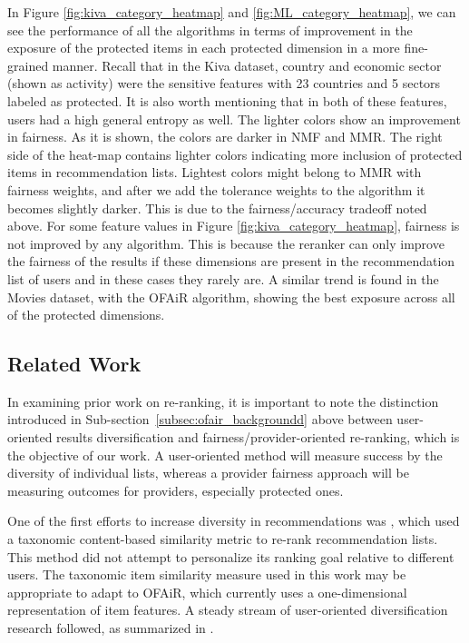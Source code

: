 In Figure \ref{fig:kiva_category_heatmap} and \ref{fig:ML_category_heatmap}, we can see the performance of all the algorithms in terms of improvement in the exposure of the protected items in each protected dimension in a more fine-grained manner. Recall that in the Kiva dataset, country and economic sector (shown as activity) were the sensitive features with 23 countries and 5 sectors labeled as protected. It is also worth mentioning that in both of these features, users had a high general entropy as well. The lighter colors show an improvement in fairness. As it is shown, the colors are darker in NMF and MMR. The right side of the heat-map contains lighter colors indicating more inclusion of protected items in recommendation lists. Lightest colors might belong to MMR with fairness weights, and after we add the tolerance weights to the algorithm it becomes slightly darker. This is due to the fairness/accuracy tradeoff noted above. For some feature values in Figure \ref{fig:kiva_category_heatmap}, fairness is not improved by any algorithm. This is because the reranker can only improve the fairness of the results if these dimensions are present in the recommendation list of users and in these cases they rarely are. A similar trend is found in the Movies dataset, with the OFAiR algorithm, showing the best exposure across all of the protected dimensions. 


\subsection{Related Work}
\label{subsec:ofair_related_work}

In examining prior work on re-ranking, it is important to note the distinction introduced in Sub-section~\ref{subsec:ofair_backgroundd} above between user-oriented results diversification and fairness/provider-oriented re-ranking, which is the objective of our work. A user-oriented method will measure success by the diversity of individual lists, whereas a provider fairness approach will be measuring outcomes for providers, especially protected ones.

One of the first efforts to increase diversity in recommendations was \cite{Ziegler:2005:IRL:1060745.1060754}, which used a taxonomic content-based similarity metric to re-rank recommendation lists. This method did not attempt to personalize its ranking goal relative to different users. The taxonomic item similarity measure used in this work may be appropriate to adapt to OFAiR, which currently uses a one-dimensional representation of item features. A steady stream of user-oriented diversification research followed, as summarized in \cite{kunaver2017diversity}.

